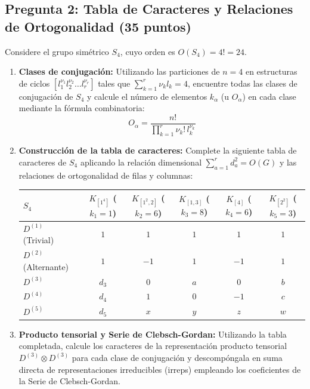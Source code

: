 \documentclass[11pt, a4paper]{article}
\begin{document}
\subsection*{Pregunta 2: Tabla de Caracteres y Relaciones de Ortogonalidad (35 puntos)}
Considere el grupo simétrico $S_4$, cuyo orden es $O(S_4) = 4! = 24$.
\begin{enumerate}
    \item \textbf{Clases de conjugación:} Utilizando las particiones de $n = 4$ en estructuras de ciclos $[l_1^{\nu_1} l_2^{\nu_2} \dots l_r^{\nu_r}]$ tales que $\sum_{k=1}^r \nu_k l_k = 4$, encuentre todas las clases de conjugación de $S_4$ y calcule el número de elementos $k_\alpha$ (u $O_\alpha$) en cada clase mediante la fórmula combinatoria:
    \[
    O_\alpha = \frac{n!}{\prod_{k=1}^r \nu_k! \, l_k^{\nu_k}}
    \]
    \item \textbf{Construcción de la tabla de caracteres:} Complete la siguiente tabla de caracteres de $S_4$ aplicando la relación dimensional $\sum_{a=1}^r d_a^2 = O(G)$ y las relaciones de ortogonalidad de filas y columnas:

    \begin{center}
    \begin{tabular}{lccccc}
    \toprule
    $S_4$ & $K_{[1^4]}$ ($k_1 = 1$) & $K_{[1^2, 2]}$ ($k_2 = 6$) & $K_{[1, 3]}$ ($k_3 = 8$) & $K_{[4]}$ ($k_4 = 6$) & $K_{[2^2]}$ ($k_5 = 3$) \\
    \midrule
    $D^{(1)}$ (Trivial) & $1$ & $1$ & $1$ & $1$ & $1$ \\
    $D^{(2)}$ (Alternante) & $1$ & $-1$ & $1$ & $-1$ & $1$ \\
    $D^{(3)}$ & $d_3$ & $0$ & $a$ & $0$ & $b$ \\
    $D^{(4)}$ & $d_4$ & $1$ & $0$ & $-1$ & $c$ \\
    $D^{(5)}$ & $d_5$ & $x$ & $y$ & $z$ & $w$ \\
    \bottomrule
    \end{tabular}
    \end{center}

    \item \textbf{Producto tensorial y Serie de Clebsch-Gordan:} Utilizando la tabla completada, calcule los caracteres de la representación producto tensorial $D^{(3)} \otimes D^{(3)}$ para cada clase de conjugación y descompóngala en suma directa de representaciones irreducibles (irreps) empleando los coeficientes de la Serie de Clebsch-Gordan.
\end{enumerate}
\end{document}
